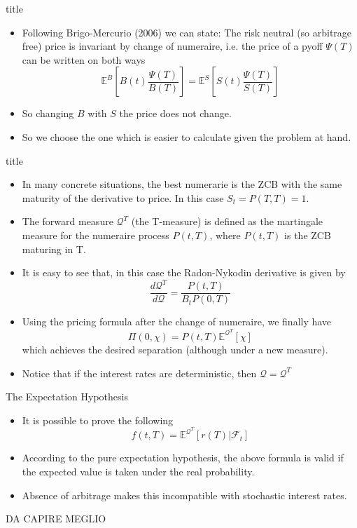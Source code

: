 \documentclass{beamer}
\begin{document}
\begin{frame}{title}
\begin{itemize}
	\item Following Brigo-Mercurio (2006) we can state: The risk neutral (so arbitrage free) price is invariant by change of numeraire, i.e. the price of a pyoff $\Psi(T)$ can be written on both ways
	\begin{equation}
	\mathbb{E}^B\left[B(t)\frac{\Psi(T)}{B(T)}\right] = 	\mathbb{E}^S\left[S(t)\frac{\Psi(T)}{S(T)}\right]
	\end{equation}
	\item So changing $B$ with $S$ the price does not change.
	\item So we choose the one which is easier to calculate given the problem at hand.
\end{itemize}
\end{frame}

\begin{frame}{title}
	\begin{itemize}
		\item In many concrete situations, the best numerarie is the ZCB with the same maturity of the derivative to price.
		In this case $S_t = P(T,T)=1$.
		\item The forward measure $\mathcal{Q}^T$ (the T-measure) is defined as the martingale measure for the numeraire process $P(t,T)$, where $P(t,T)$ is the ZCB maturing in T.
		\item It is easy to see that, in this case the Radon-Nykodin derivative is given by
		\begin{equation}
			\frac{d\mathcal{Q}^T}{d\mathcal{Q}} = \frac{P(t,T)}{B_t P(0,T)} 
		\end{equation}
		\item Using the pricing formula after the change of numeraire, we finally have
		\begin{equation}
			\Pi(0,\chi)=P(t,T)\mathbb{E}^{\mathcal{Q}^T}[\chi]
		\end{equation}
		which achieves the desired separation (although under a new measure).
		\item Notice that if the interest rates are deterministic, then $\mathcal{Q} = \mathcal{Q}^T$
	\end{itemize}
\end{frame}

\begin{frame}{The Expectation Hypothesis}
	\begin{itemize}
		\item It is possible to prove the following
		\begin{equation}
			f(t, T) = \mathbb{E}^{\mathcal{Q}^T}[r(T)|\mathcal{F}_t]
		\end{equation}
		\item According to the pure expectation hypothesis, the above formula is valid if the expected value is taken under the real probability.
		\item Absence of arbitrage makes this incompatible with stochastic interest rates.
	\end{itemize}
	DA CAPIRE MEGLIO
\end{frame}
\end{document}
